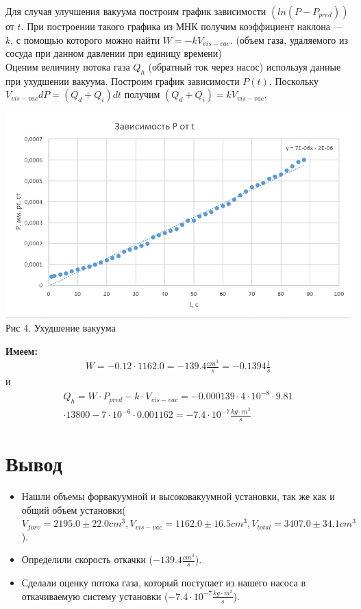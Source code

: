 \documentclass[a4paper, 12pt]{article}
\begin{document}
Для случая улучшения вакуума построим график зависимости $(ln(P-P_{pred}))$ от $t$. При построении такого графика из МНК получим коэффициент наклона --- $k$, с помощью которого можно найти $W = -kV_{vis-vac}$. (объем газа, \bigskip удаляемого из сосуда при данном давлении при единицу времени)\\

Оценим величину потока газа  $Q_h$ (обратный ток через насос) используя данные при ухудшении вакуума. Построим график зависимости $P(t)$. Поскольку $V_{vis-vac}dP = (Q_d + Q_i) dt$ получим $(Q_d + Q_i) = kV_{vis-vac}$.
\begin{center}
	\includegraphics[width=15cm]{12.jpg}\\
	Рис 4. Ухудшение вакуума
\end{center}

\textbf{Имеем:}
\begin{align}
	W = -0.12 \cdot 1162.0 = - 139.4 \frac{cm^3}{s} = -0.1394 \frac{l}{s}
\end{align}
и
\begin{align}
	Q_h = W \cdot P_{pred} - k \cdot V_{vis-vac} = -0.000139 \cdot 4 \cdot 10^{-8}\cdot 9.81 \\ \cdot 13800 - 7 \cdot 10^{-6} \cdot 0.001162 = - 7.4 \cdot 10^{-7} \frac{kg \cdot m^3}{s}
\end{align}

\section{Вывод}
\begin{itemize}
	\item Нашли объемы форвакуумной и высоковакуумной установки, так же как и общий объем установки($V_{forv} = 2195.0 \pm 22.0 cm^3, V_{vis-vac} = 1162.0 \pm 16.5 cm^3, V_{total} = 3407.0 \pm 34.1 cm^3$).
	\item Определили скорость откачки ($- 139.4 \frac{cm^3}{s}$).
	\item Сделали оценку потока газа, который поступает из нашего насоса в откачиваемую систему установки ($- 7.4 \cdot 10^{-7} \frac{kg \cdot m^3}{s}$).
\end{itemize}
\end{document}
